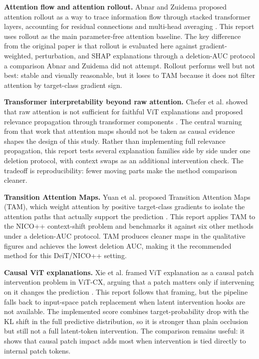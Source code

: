 \documentclass[10pt]{article}
\begin{document}
\textbf{Attention flow and attention rollout.} Abnar and Zuidema proposed attention rollout as a way to trace information flow through stacked transformer layers, accounting for residual connections and multi-head averaging \cite{abnar2020quantifying}. This report uses rollout as the main parameter-free attention baseline. The key difference from the original paper is that rollout is evaluated here against gradient-weighted, perturbation, and SHAP explanations through a deletion-AUC protocol a comparison Abnar and Zuidema did not attempt. Rollout performs well but not best: stable and visually reasonable, but it loses to TAM because it does not filter attention by target-class gradient sign.

\textbf{Transformer interpretability beyond raw attention.} Chefer et al. showed that raw attention is not sufficient for faithful ViT explanations and proposed relevance propagation through transformer components \cite{chefer2021transformer}. The central warning from that work that attention maps should not be taken as causal evidence shapes the design of this study. Rather than implementing full relevance propagation, this report tests several explanation families side by side under one deletion protocol, with context swaps as an additional intervention check. The tradeoff is reproducibility: fewer moving parts make the method comparison cleaner.

\textbf{Transition Attention Maps.} Yuan et al. proposed Transition Attention Maps (TAM), which weight attention by positive target-class gradients to isolate the attention paths that actually support the prediction \cite{yuan2021tam}. This report applies TAM to the NICO++ context-shift problem and benchmarks it against six other methods under a deletion-AUC protocol. TAM produces cleaner maps in the qualitative figures and achieves the lowest deletion AUC, making it the recommended method for this DeiT/NICO++ setting.

\textbf{Causal ViT explanations.} Xie et al. framed ViT explanation as a causal patch intervention problem in ViT-CX, arguing that a patch matters only if intervening on it changes the prediction \cite{xie2023vitcx}. This report follows that framing, but the pipeline falls back to input-space patch replacement when latent intervention hooks are not available. The implemented score combines target-probability drop with the KL shift in the full predictive distribution, so it is stronger than plain occlusion but still not a full latent-token intervention. The comparison remains useful: it shows that causal patch impact adds most when intervention is tied directly to internal patch tokens.
\end{document}

